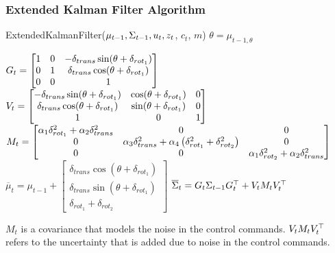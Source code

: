\begin{frame}
    \frametitle{Extended Kalman Filter Algorithm}
    \footnotesize
    \begin{algorithmic}[1]
    \State ExtendedKalmanFilter({$\mu_{t-1}, \Sigma_{t-1}, u_{t}, z_{t}$, $c_{t}$, $m$})
    \State $\theta = \mu_{t-1,\theta}$
   
    \State $
    G_{t} =
    \begin{bmatrix}
    1 & 0 & -\delta_{trans} \sin(\theta + \delta_{rot_{1}})\\
    0 & 1 & \delta_{trans} \cos(\theta + \delta_{rot_{1}})\\
    0 & 0 & 1\\
    \end{bmatrix}
    $
    \State $
    V_{t} =
    \begin{bmatrix}
    -\delta_{trans} \sin(\theta + \delta _{rot_{1}}) & \cos(\theta + \delta _{rot_{1}}) & 0\\
    \delta _{trans} \cos(\theta + \delta _{rot_{1}}) & \sin(\theta + \delta _{rot _{1}}) & 0\\
    1 & 0 & 1\\
    \end{bmatrix}
    $
    \State $
    M_{t} =
    \begin{bmatrix}
    \alpha_{1}\delta^{2}_{rot_{1}} + \alpha_{2}\delta^{2}_{trans} & 0 & 0\\
    0 & \alpha_{3} \delta^{2}_{trans} + \alpha_{4} \left( \delta^{2}_{rot_{1}} + \delta^{2}_{rot_{2}} \right) & 0\\
    0 & 0 & \alpha_{1}\delta^{2}_{rot_{2}} + \alpha_{2}\delta^{2}_{trans}\\
    \end{bmatrix}
    $
    \State $\overline{\mu}_{t} = \mu_{t-1} +
    \begin{bmatrix}
    \delta_{trans}\cos(\theta+\delta_{rot_{1}}) \\
    \delta_{trans}\sin(\theta+\delta_{rot_{1}}) \\
    \delta_{rot_{1}} + \delta_{rot_{2}}
    \end{bmatrix}$
    \State $\overline{\Sigma}_{t} = G_{t} \Sigma_{t-1} G_{t}^{\top}+V_{t} M_{t} V_{t}^{\top}$
    \end{algorithmic}
    \vspace{1em}
    $M_{t}$ is a covariance that models the noise in the control commands.
    $V_{t} M_{t} V_{t}^{\top}$ refers to the uncertainty that is added due to noise in the control commands.
   
   \end{frame}
   

